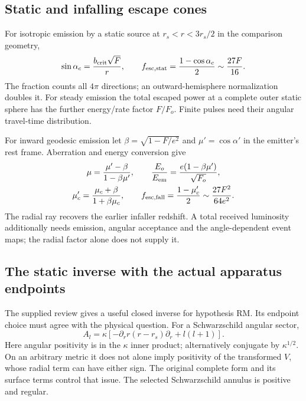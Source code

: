 \documentclass[10pt,twocolumn,letterpaper]{article}
\begin{document}
\subsection{Static and infalling escape cones}
For isotropic emission by a static source at $r_s<r<3r_s/2$ in the
comparison geometry,
\begin{equation}
 \sin\alpha_c=\frac{b_{\rm crit}\sqrt F}{r},\qquad
 f_{\rm esc,stat}=\frac{1-\cos\alpha_c}{2}
                   \sim\frac{27F}{16}.
 \label{eq:wp-escape-static}
\end{equation}
The fraction counts all $4\pi$ directions; an outward-hemisphere
normalization doubles it. For steady emission the total escaped power at
a complete outer static sphere has the further energy/rate factor $F/F_o$.
Finite pulses need their angular travel-time distribution.

For inward geodesic emission let $\beta=\sqrt{1-F/e^2}$ and
$\mu'=\cos\alpha'$ in the emitter's rest frame. Aberration and energy
conversion give
\begin{equation}
\begin{gathered}
 \mu=\frac{\mu'-\beta}{1-\beta\mu'},\qquad
 \frac{E_o}{E_{\rm em}}=\frac{e(1-\beta\mu')}{\sqrt{F_o}},\\
 \mu'_c=\frac{\mu_c+\beta}{1+\beta\mu_c},\qquad
 f_{\rm esc,fall}=\frac{1-\mu'_c}{2}
                    \sim\frac{27F^2}{64e^2}.
\end{gathered}
\label{eq:wp-escape-fall}
\end{equation}
The radial ray recovers the earlier infaller redshift. A total received
luminosity additionally needs emission, angular acceptance and the
angle-dependent event maps; the radial factor alone does not supply it.


\subsection{The static inverse with the actual apparatus endpoints}
The supplied review gives a useful closed inverse for hypothesis RM.
Its endpoint choice must agree with the physical question. For a
Schwarzschild angular sector,
\begin{equation}
 A_l=\kappa\left[-\partial_r r(r-r_s)\partial_r+l(l+1)\right].
 \label{eq:li-static-A}
\end{equation}
Here angular positivity is in the $\kappa$ inner product; alternatively
conjugate by $\kappa^{1/2}$. On an arbitrary metric it does not alone
imply positivity of the transformed $V$, whose radial term can have either
sign. The original complete form and its surface terms control that issue.
The selected Schwarzschild annulus is positive and regular.
\end{document}
